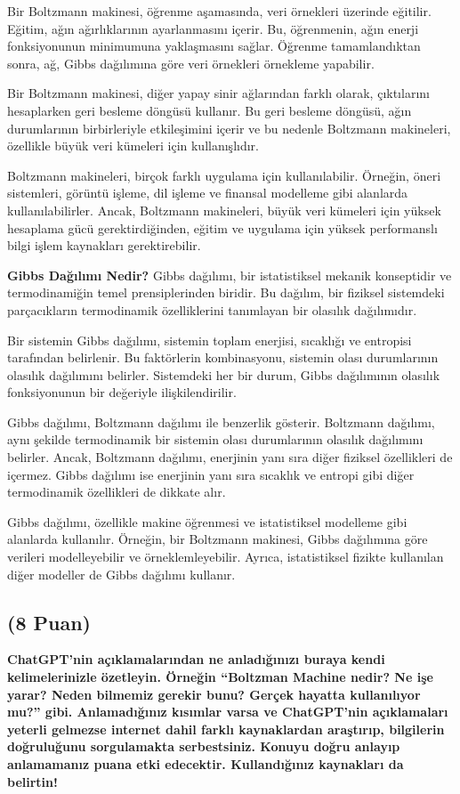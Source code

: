 \documentclass[11pt]{article}
\begin{document}
Bir Boltzmann makinesi, öğrenme aşamasında, veri örnekleri üzerinde eğitilir. Eğitim, ağın ağırlıklarının ayarlanmasını içerir. Bu, öğrenmenin, ağın enerji fonksiyonunun minimumuna yaklaşmasını sağlar. Öğrenme tamamlandıktan sonra, ağ, Gibbs dağılımına göre veri örnekleri örnekleme yapabilir.

Bir Boltzmann makinesi, diğer yapay sinir ağlarından farklı olarak, çıktılarını hesaplarken geri besleme döngüsü kullanır. Bu geri besleme döngüsü, ağın durumlarının birbirleriyle etkileşimini içerir ve bu nedenle Boltzmann makineleri, özellikle büyük veri kümeleri için kullanışlıdır.

Boltzmann makineleri, birçok farklı uygulama için kullanılabilir. Örneğin, öneri sistemleri, görüntü işleme, dil işleme ve finansal modelleme gibi alanlarda kullanılabilirler. Ancak, Boltzmann makineleri, büyük veri kümeleri için yüksek hesaplama gücü gerektirdiğinden, eğitim ve uygulama için yüksek performanslı bilgi işlem kaynakları gerektirebilir.

\textbf{Gibbs Dağılımı Nedir?}
Gibbs dağılımı, bir istatistiksel mekanik konseptidir ve termodinamiğin temel prensiplerinden biridir. Bu dağılım, bir fiziksel sistemdeki parçacıkların termodinamik özelliklerini tanımlayan bir olasılık dağılımıdır.

Bir sistemin Gibbs dağılımı, sistemin toplam enerjisi, sıcaklığı ve entropisi tarafından belirlenir. Bu faktörlerin kombinasyonu, sistemin olası durumlarının olasılık dağılımını belirler. Sistemdeki her bir durum, Gibbs dağılımının olasılık fonksiyonunun bir değeriyle ilişkilendirilir.

Gibbs dağılımı, Boltzmann dağılımı ile benzerlik gösterir. Boltzmann dağılımı, aynı şekilde termodinamik bir sistemin olası durumlarının olasılık dağılımını belirler. Ancak, Boltzmann dağılımı, enerjinin yanı sıra diğer fiziksel özellikleri de içermez. Gibbs dağılımı ise enerjinin yanı sıra sıcaklık ve entropi gibi diğer termodinamik özellikleri de dikkate alır.

Gibbs dağılımı, özellikle makine öğrenmesi ve istatistiksel modelleme gibi alanlarda kullanılır. Örneğin, bir Boltzmann makinesi, Gibbs dağılımına göre verileri modelleyebilir ve örneklemleyebilir. Ayrıca, istatistiksel fizikte kullanılan diğer modeller de Gibbs dağılımı kullanır.
 
\subsection{(8 Puan)} \textbf{ChatGPT’nin açıklamalarından ne anladığınızı buraya kendi kelimelerinizle özetleyin. Örneğin ``Boltzman Machine nedir? Ne işe yarar? Neden bilmemiz gerekir bunu? Gerçek hayatta kullanılıyor mu?'' gibi. Anlamadığınız kısımlar varsa ve ChatGPT’nin açıklamaları yeterli gelmezse internet dahil farklı kaynaklardan araştırıp, bilgilerin doğruluğunu sorgulamakta serbestsiniz. Konuyu doğru anlayıp anlamamanız puana etki edecektir. Kullandığınız kaynakları da belirtin!}
\end{document}
